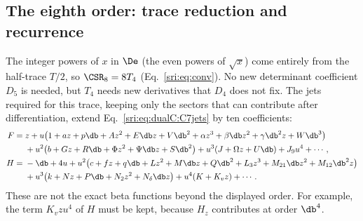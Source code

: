 \subsection{The eighth order: trace reduction and recurrence}\label{sri:app:dualC:C8setup}
The integer powers of $x$ in $\De$ (the even powers of $\sqrt x$) come entirely from the half-trace $T/2$, so
$\CSR_8=8T_4$ (Eq.~\eqref{sri:eq:conv}). No
new determinant coefficient $D_5$ is needed, but $T_4$ needs new derivatives that $D_4$ does not fix. The jets
required for this trace, keeping only the sectors that can contribute after differentiation, extend
Eq.~\eqref{sri:eq:dualC:C7jets} by ten coefficients:
\begin{equation}
\begin{aligned}
 F={}&z+u\bigl(1+az+p\db+Az^2+E\db z+V\db^2+\alpha z^3+\beta\db z^2+\gamma\db^2z+W\db^3\bigr)\\
 &+u^2\bigl(b+Gz+R\db+\Phi z^2+\Psi\db z+S\db^2\bigr)+u^3(J+\Omega z+U\db)+J_9u^4+\cdots,\\
 H={}&-\db+4u+u^2\bigl(c+fz+q\db+Lz^2+M\db z+Q\db^2+L_3z^3+M_{21}\db z^2+M_{12}\db^2z\bigr)\\
 &+u^3\bigl(k+Nz+P\db+N_2z^2+N_\delta\db z\bigr)+u^4(K+K_vz)+\cdots.
\end{aligned}
\label{sri:eq:dualC:C8jets}
\end{equation}
These are not the exact beta functions beyond the displayed order. For example, the term $K_vzu^4$ of $H$ must be kept,
because $H_z$ contributes at order $\db^4$.

